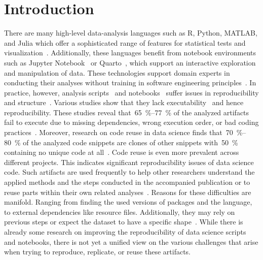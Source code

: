 \section{Introduction}
There are many high-level data-analysis languages such as R, Python, MATLAB, and Julia which offer a sophisticated range of features for statistical tests and visualization~\cite{hadley2016r,embarak2018data,DBLP:conf/sc/PrabhuJRZHKJLGB11}. Additionally, these languages benefit from notebook environments such as Jupyter Notebook~\cite{DBLP:journals/cse/GrangerP21} or Quarto~\cite{Allaire_Quarto_2024}, which support an interactive exploration and manipulation of data. These technologies support domain experts in conducting their analyses without training in software engineering principles~\cite{DBLP:journals/rjour/Vidoni21}. 
In practice, however, analysis scripts~\cite{trisovic_largescale_2022,DBLP:conf/msr/SihlerPSTDD24}
and notebooks~\cite{DBLP:conf/msr/IslamAW24,DBLP:conf/msr/PimentelMBF19,10.1093/gigascience/giad113} suffer issues in reproducibility and structure~\cite{DBLP:conf/vl/0002HB20}. 
Various studies show that they lack executability~\cite{trisovic_largescale_2022,DBLP:conf/msr/PimentelMBF19,10.1093/gigascience/giad113,DBLP:conf/msr/IslamAW24} and hence reproducibility. These studies reveal that~\qtyrange{65}{77}{\percent} of the analyzed artifacts fail to execute due to missing dependencies, wrong execution order, or bad coding practices~\cite{trisovic_largescale_2022}. Moreover, research on code reuse in data science finds that~\qtyrange{70}{80}{\percent} of the analyzed code snippets are clones of other snippets with~\qty{50}{\percent} containing no unique code at all~\cite{10.7717/peerj.13933,DBLP:journals/programming/KallenW21}. Code reuse is even more prevalent across different projects. This indicates significant reproducibility issues of data science code.
Such artifacts are used frequently to help other researchers understand the applied methods and the steps conducted in the accompanied publication or to reuse parts within their own related analyses~\cite{DBLP:conf/vl/KoenzenES20,10.7717/peerj.13933}.
Reasons for these difficulties are manifold. Ranging from finding the used versions of packages and the language, to external dependencies like resource files. Additionally, they may rely on previous steps or expect the dataset to have a specific shape~\cite{trisovic_largescale_2022}.
While there is already some research on improving the reproducibility of data science scripts and notebooks, there is not yet a unified view on the various challenges that arise when trying to reproduce, replicate, or reuse these artifacts.
